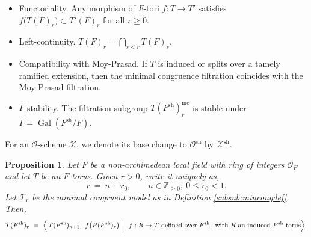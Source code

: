 \documentclass[american]{article}
\numberwithin{equation}{section}
\numberwithin{figure}{section}
\theoremstyle{plain}
\newtheorem{proposition}[theorem]{Proposition}
\theoremstyle{definition}
\theoremstyle{remark}
\begin{document}
\begin{itemize}[leftmargin=1.8em]
    \item Functoriality.\label{lem:functorial}
    Any morphism of $F$-tori $f:T\to T'$ satisfies $f\bigl(T(F)_r\bigr)\subset T'(F)_r$ for all $r\ge0$.
    
    \item Left-continuity.
    $T(F)_r=\bigcap_{s<r}T(F)_s$.
    
    \item Compatibility with Moy-Prasad.
    If $T$ is induced or splits over a tamely ramified extension, then the minimal congruence filtration coincides with the Moy-Prasad filtration.
    
    \item $\Gamma$-stability.\label{prop:Gamma-stable}  
    The filtration subgroup $T(F^{\mathrm{sh}})^{\mathrm{mc}}_r$ is stable under $\Gamma = \operatorname{Gal}(F^{\mathrm{sh}}/F)$.
\end{itemize}

 For an \(\mathcal{O}\)-scheme \(\mathscr{X}\), we denote its base change to \(\mathcal{O}^{\mathrm{sh}}\) by $\mathscr{X}^{\mathrm{sh}}$.

\begin{proposition}\label{P:depth-shift}
Let \(F\) be a non-archimedean local field with ring of integers \(\mathcal{O}_{F}\) and let \(T\) be an \(F\)-torus. Given \(r>0\), write it uniquely as,
\[r\ =\ n+r_{0},\qquad n\in\mathbb{Z}_{\geq 0},\ 0\leq r_{0}<1.\]
Let \(\mathscr{T}_{r}\) be the minimal congruent model as in Definition \ref{subsub:mincongdef}. Then,
\[
T(F^{\textnormal{sh}})_{r}\ =\ \Big{\langle}\,T(F^{\textnormal{sh}})_{n+1},\ f\big{(}R(F^{\textnormal{sh}})_{r}\big{)}\ \Big{|}\ \ f:R\to T \text{ defined over } F^{\mathrm{sh}}, \text{ with } R \text{ an induced } F^{\mathrm{sh}}\text{-torus}\Big{\rangle}.
\]
\end{proposition}
\end{document}
